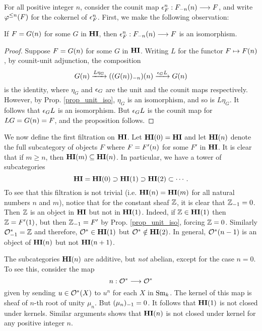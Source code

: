 For all positive integer $n$, consider the counit map $\cuHI_F^n: 
\LHI[n]{\RHI[n]{F}} \to F$, and write $\tlHI{n}(F)$ for the 
cokernel of $\cuHI_F^n$. First, we make the following observation:

\begin{prop}\label{prop_counit_iso_for_HIn}
If $F = \LHI[n]{G}$ for some $G$ in $\HI$, then $\cuHI^n_F : 
\LHI[n]{\RHI[n]{F}} \to F$ is an isomorphism.
\end{prop}
\begin{proof}
Suppose $F = \LHI[n]{G}$ for some $G$ in $\HI$. Writing $L$ for 
the functor 
$F \mapsto \LHI[n]F$, by counit-unit adjunction, the composition
\[
\LHI[n]{G} \xrightarrow{L\eta_G} \LHI[n]{(\RHI[n]{(\LHI[n]{G})})}
   \xrightarrow{\cuHI_G L} \LHI[n]{G}
\]
is the identity, where $\eta_{G}$ and $\cuHI_{G}$ are the unit and 
the counit maps respectively. However, by Prop. \ref{prop_unit_iso}, 
$\eta_{G}$ is an isomorphism, and so is $L\eta_{G}$. It follows
that $\cuHI_G L$ is an isomorphism. But $\cuHI_G L$ is the counit
map for $LG = \LHI[n]{G} = F$, and the proposition follows.
\end{proof}

We now define the first filtration on $\HI$. Let $\LHI[0]{\HI} = 
\HI$ and let $\LHI[n]{\HI}$ denote the full subcategory of objects 
$F$ where $F = \LHI[n]{F'}$ for some $F'$ in $\HI$. It is clear 
that if $m \geq n$, then $\LHI[m]{\HI} \subseteq \LHI[n]{\HI}$. 
In particular, we have a tower of subcategories
\[
\HI = \LHI[0]{\HI} \supset \LHI[1]{\HI} \supset \LHI[2]{\HI} 
\subset \cdots.
\]
To see that this filtration is not trivial (i.e. $\LHI[n]{\HI} =
\LHI[m]{\HI}$ for all natural numbers $n$ and $m$), notice that
for the constant sheaf $\Z$, it is clear that $\RHI{\Z} = 0$. 
Then $\Z$ is an object in $\HI$ but not in $\LHI{\HI}$. Indeed, if 
$\Z \in \LHI{\HI}$ then $\Z = \LHI{F'}$, but then $\RHI{\Z} = F'$ 
by Prop. \ref{prop_unit_iso}, forcing $\Z = 0$. Similarly
$\RHI{\Ox} = \Z$ and therefore, $\Ox \in \LHI{\HI}$ but $\Ox \notin
\LHI[2]{\HI}$. In general, $\LHI[n - 1]{\Ox}$ is an object of
$\LHI[n]{\HI}$ but not $\LHI[n + 1]{\HI}$.

\begin{rmk}
The subcategories $\LHI[n]{\HI}$ are additive, but \emph{not} 
abelian, except for the case $n = 0$. To see this, consider the 
map
\[
n: \Ox \to \Ox
\]
given by sending $u \in \Ox(X)$ to $u^n$ for each $X$ in $\Sm$.
The kernel of this map is sheaf of $n$-th root of unity $\mu_n$.
But $\RHI{(\mu_n)} = 0$. It follows that $\LHI{\HI}$ is not closed
under kernels. Similar arguments shows that $\LHI[n]{\HI}$ is
not closed under kernel for any positive integer $n$.
\end{rmk}

